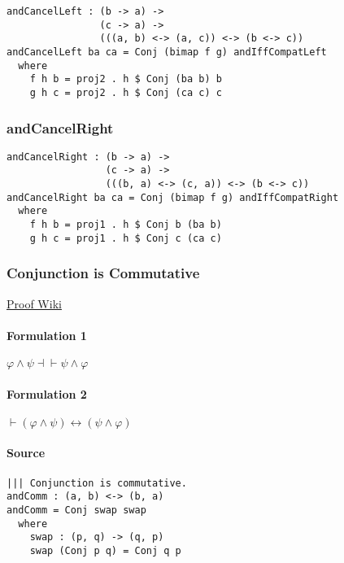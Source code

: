 \documentclass{acm_proc_article-sp}
\renewcommand{\iff}{\leftrightarrow}
\begin{document}
\begin{verbatim}
andCancelLeft : (b -> a) ->
                (c -> a) ->
                (((a, b) <-> (a, c)) <-> (b <-> c))
andCancelLeft ba ca = Conj (bimap f g) andIffCompatLeft
  where
    f h b = proj2 . h $ Conj (ba b) b
    g h c = proj2 . h $ Conj (ca c) c
\end{verbatim}

\subsubsection{andCancelRight}\label{andcancelright}

\begin{verbatim}
andCancelRight : (b -> a) ->
                 (c -> a) ->
                 (((b, a) <-> (c, a)) <-> (b <-> c))
andCancelRight ba ca = Conj (bimap f g) andIffCompatRight
  where
    f h b = proj1 . h $ Conj b (ba b)
    g h c = proj1 . h $ Conj c (ca c)
\end{verbatim}

\newpage

\subsubsection{Conjunction is
Commutative}\label{conjunction-is-commutative}

\href{https://proofwiki.org/wiki/Rule_of_Commutation/Conjunction}{Proof
Wiki}

\paragraph{Formulation 1}\label{formulation-1}

\(\varphi \land \psi \dashv\vdash \psi \land \varphi\)

\paragraph{Formulation 2}\label{formulation-2}

\(\vdash (\varphi \land \psi) \iff (\psi \land \varphi)\)

\paragraph{Source}\label{source}

\begin{verbatim}
||| Conjunction is commutative.
andComm : (a, b) <-> (b, a)
andComm = Conj swap swap
  where
    swap : (p, q) -> (q, p)
    swap (Conj p q) = Conj q p
\end{verbatim}
\end{document}

